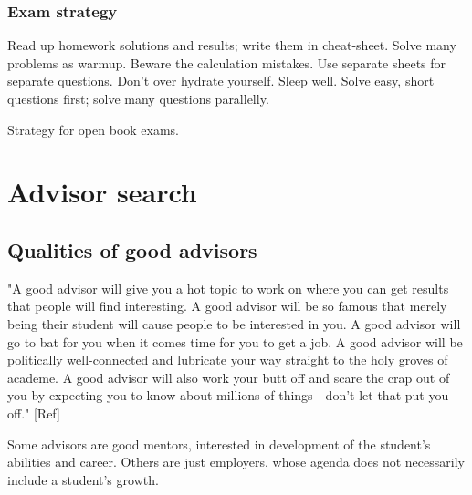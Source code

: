 \documentclass[oneside, article]{memoir}
\begin{document}
\subsection{Exam strategy}
Read up homework solutions and results; write them in cheat-sheet. Solve many problems as warmup. Beware the calculation mistakes. Use separate sheets for separate questions. Don't over hydrate yourself. Sleep well. Solve easy, short questions first; solve many questions parallelly.

\subitem Strategy for open book exams.


\chapter{Advisor search}
\section{Qualities of good advisors}
"A good advisor will give you a hot topic to work on where you can get results that people will find interesting. A good advisor will be so famous that merely being their student will cause people to be interested in you. A good advisor will go to bat for you when it comes time for you to get a job. A good advisor will be politically well-connected and lubricate your way straight to the holy groves of academe. A good advisor will also work your butt off and scare the crap out of you by expecting you to know about millions of things - don't let that put you off." [Ref]

Some advisors are good mentors, interested in development of the student's abilities and career. Others are just employers, whose agenda does not necessarily include a student's growth.
\end{document}
